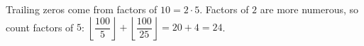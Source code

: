 Trailing zeros come from factors of $10=2\cdot5$. Factors of $2$ are more numerous, so count factors of $5$: $\left\lfloor\dfrac{100}{5}\right\rfloor+\left\lfloor\dfrac{100}{25}\right\rfloor=20+4=\boxed{24}$.
